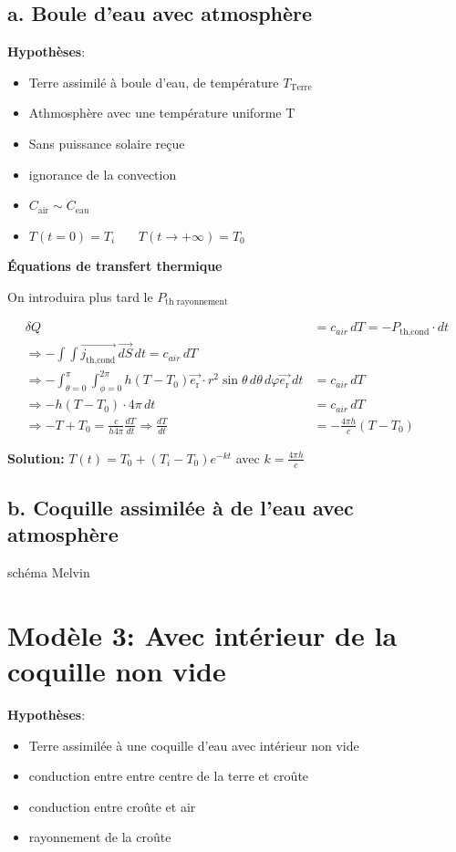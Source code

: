 \documentclass[a4paper,12pt]{article}
\begin{document}
\subsection{a. Boule d'eau avec atmosphère }
\textbf{Hypothèses}:
\begin{itemize}
    \item Terre assimilé à boule d'eau, de température \(T_{\text{Terre}}\) 
    \item  Athmosphère avec une température uniforme T 
    \item  Sans puissance solaire reçue  
    \item  ignorance de la convection  
    \item \(C_{\text{air}}\sim C_{\text{eau}}\) 
    \item $T(t=0) = T_i$ \ \ \
$T(t \to +\infty) = T_0$
   
\end{itemize}
\textbf{Équations de transfert thermique}

On introduira plus tard le \(P_{\text{th rayonnement}}\)

\begin{align*}
\delta Q &= c_{air}\, dT = -P_{\text{th,cond}} \cdot dt \\
\Rightarrow -\int \int \vec{j_{\text{th,cond}}}\, \vec{dS}\,dt = c_{air}\, dT \\
\Rightarrow -\int_{\theta=0}^\pi \int_{\phi=0}^{2\pi} h(T - T_0) \vec{e_{\text{r}}}\cdot r^2 \sin\theta\, d\theta\, d\varphi \vec{e_{\text{r}}}\, dt &=  c_{air}\, dT  \\
\Rightarrow -h(T - T_0) \cdot 4\pi\, dt &= c_{air}\, dT \\
\Rightarrow -T + T_0 = \frac{c}{h 4\pi} \frac{dT}{dt} \Rightarrow \frac{dT}{dt} &= -\frac{4\pi h}{c}(T - T_0)
\end{align*}

\vspace{0.5cm}

\textbf{Solution:} 
$T(t) = T_0 + (T_i - T_0)e^{-kt}$ \quad avec $k = \frac{4\pi h}{c}$

\subsection{b. Coquille assimilée à de l'eau avec atmosphère }
schéma Melvin

\section{Modèle 3: Avec intérieur de la coquille non vide }
\textbf{Hypothèses}:
\begin{itemize}
    \item Terre assimilée à une coquille d'eau avec intérieur non vide 
    \item  conduction entre entre centre de la terre et croûte 
    \item  conduction entre croûte et air 
    \item  rayonnement de la croûte
    
    
    
\end{itemize}
\end{document}
